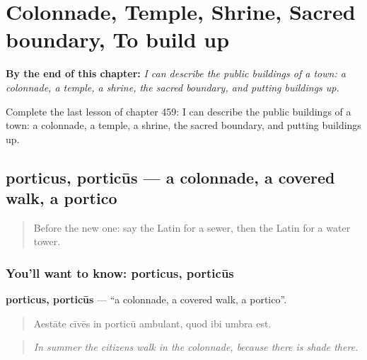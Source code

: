 
\chapter{Colonnade, Temple, Shrine, Sacred boundary, To build up}
\label{ch:la-colonnade-temple-shrine-sacred-boundary-to-build-up}

\begin{chapteropening}
\textbf{By the end of this chapter:} \emph{I can describe the public buildings of a town: a colonnade, a temple, a shrine, the sacred boundary, and putting buildings up.}

Complete the last lesson of chapter 459: I can describe the public buildings of a town: a colonnade, a temple, a shrine, the sacred boundary, and putting buildings up.
\end{chapteropening}

\section[porticus, porticūs]{porticus, porticūs — a colonnade, a covered walk, a portico}

\label{lesson:LA-C459-porticus}



\begin{quote}
Before the new one: say the Latin for a sewer, then the Latin for a water tower.
\end{quote}

\subsection*{You'll want to know: porticus, porticūs}
\textbf{porticus, porticūs} — \textquotedblleft{}a colonnade, a covered walk, a portico\textquotedblright{}.

\begin{quote}
Aestāte cīvēs in porticū ambulant, quod ibi umbra est.
\end{quote}

\begin{quote}
\emph{In summer the citizens walk in the colonnade, because there is shade there.}
\end{quote}

